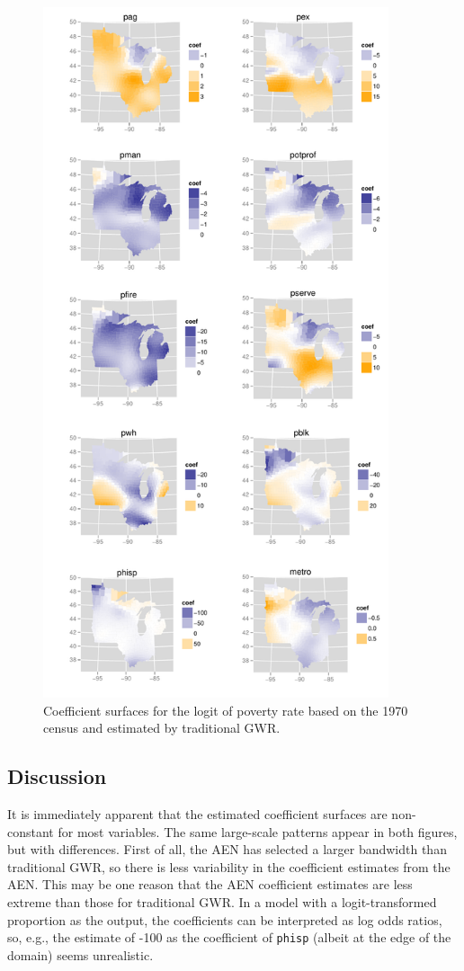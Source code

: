 \documentclass[authoryear, review, 11pt]{elsarticle}
\begin{document}
	\begin{figure}
		\begin{center}
			\includegraphics[height=8in]{../../figures/poverty/1970-gwr.pdf}
			\caption{Coefficient surfaces for the logit of poverty rate based on the 1970 census and estimated by traditional GWR. \label{fig:gwr-coefs-1970}}
		\end{center}
	\end{figure}	
			
	\subsection{Discussion}
	It is immediately apparent that the estimated coefficient surfaces are non-constant for most variables. The same large-scale patterns appear in both figures, but with differences. First of all, the AEN has selected a larger bandwidth than traditional GWR, so there is less variability in the coefficient estimates from the AEN. This may be one reason that the AEN coefficient estimates are less extreme than those for traditional GWR. In a model with a logit-transformed proportion as the output, the coefficients can be interpreted as log odds ratios, so, e.g., the estimate of -100 as the coefficient of \verb!phisp! (albeit at the edge of the domain) seems unrealistic.
	
\end{document}

